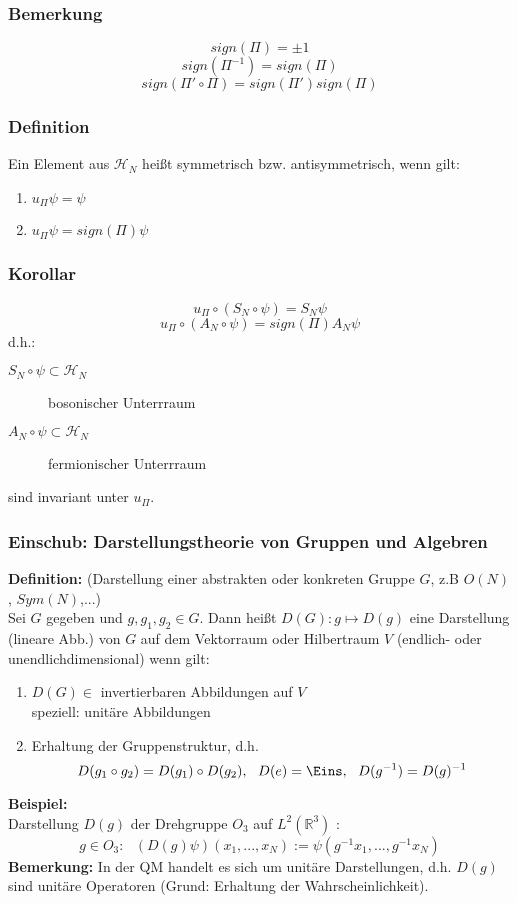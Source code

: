 \documentclass[twoside,a4paper]{scrartcl}
\renewcommand{\1}{\mathds{1}}
\begin{document}
\subsubsection*{Bemerkung}
$$sign(\Pi)=\pm 1$$
$$sign(\Pi^{-1})=sign(\Pi)$$
$$sign(\Pi' \circ \Pi)=sign(\Pi')sign(\Pi)$$

\subsubsection*{Definition}
Ein Element aus $\mathcal H_N$ heißt symmetrisch bzw. antisymmetrisch, wenn gilt:
\begin{enumerate}
 \item $u_\Pi \psi=\psi$
 \item $u_\Pi \psi=sign(\Pi)\psi$
\end{enumerate}

\subsubsection*{Korollar}
$$u_\Pi \circ (S_N \circ \psi)=S_N \psi$$
$$u_\Pi \circ (A_N \circ \psi)=sign(\Pi)A_N \psi$$
d.h.:
\begin{description}
 \item[$S_N \circ \psi\subset \mathcal H_N$] bosonischer Unterrraum
 \item[$A_N \circ \psi \subset \mathcal H_N$] fermionischer Unterrraum
 \end{description}
sind invariant unter $u_\Pi$.



\subsubsection*{Einschub: Darstellungstheorie von Gruppen und Algebren}
\textbf{Definition:} (Darstellung einer abstrakten oder konkreten Gruppe $G$, z.B $O(N)$, $Sym(N)$,...)\\
Sei $G$ gegeben und $g,g_1,g_2 \in G$. Dann heißt $D(G): g \mapsto D(g)$ eine Darstellung (lineare Abb.) von $G$ auf dem Vektorraum oder Hilbertraum $V$ (endlich- oder unendlichdimensional) wenn gilt:
\begin{enumerate}
 \item $D(G) \in$ invertierbaren Abbildungen auf $V$\\
speziell: unitäre Abbildungen
 \item Erhaltung der Gruppenstruktur, d.h. $$D(g_1 \circ g_2)=D(g_1) \circ D(g_2), \ \ D(e)=\Eins, \ \ D(g^{-1})=D(g)^{-1}$$
\end{enumerate}
\textbf{Beispiel:}\\
Darstellung $D(g)$ der Drehgruppe $O_3$ auf $L^2(\mathbb R^3)$ :
$$g \in O_3: \ \ \ (D(g)\psi)(x_1,...,x_N):=\psi(g^{-1}x_1,...,g^{-1}x_N)$$
\textbf{Bemerkung:}
In der QM handelt es sich um unitäre Darstellungen, d.h. $D(g)$ sind unitäre Operatoren (Grund: Erhaltung der Wahrscheinlichkeit).
\end{document}
